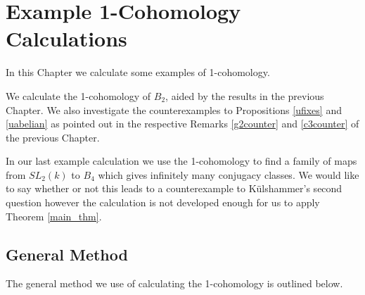 
\chapter{Example 1-Cohomology Calculations}
\label{Chapter6}
In this Chapter we calculate some examples of 1-cohomology.

We calculate the 1-cohomology of $B_2$, aided by the results in the previous Chapter. We also investigate the counterexamples to Propositions \ref{ufixes} and \ref{uabelian} as pointed out in the respective Remarks \ref{g2counter} and \ref{c3counter} of the previous Chapter.

In our last example calculation we use the 1-cohomology to find a family of maps from $SL_2(k)$ to $B_4$ which gives infinitely many conjugacy classes. We would like to say whether or not this leads to a counterexample to K\"ulshammer's second question however the calculation is not developed enough for us to apply Theorem \ref{main_thm}.

\section{General Method}
The general method we use of calculating the 1-cohomology is outlined below.

